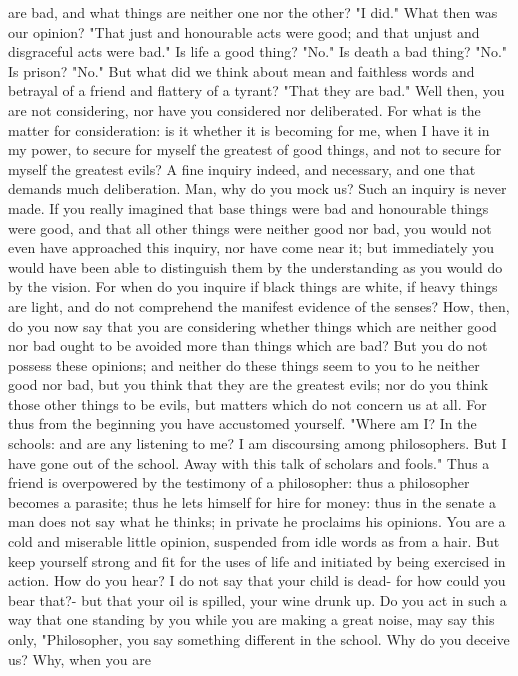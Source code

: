 \documentclass[a4paper]{article}
\begin{document}
are bad, and what things are neither one nor the other? "I did." What then was
our opinion? "That just and honourable acts were good; and that unjust and
disgraceful acts were bad." Is life a good thing? "No." Is death a bad thing?
"No." Is prison? "No." But what did we think about mean and faithless words and
betrayal of a friend and flattery of a tyrant? "That they are bad." Well then,
you are not considering, nor have you considered nor deliberated. For what is
the matter for consideration: is it whether it is becoming for me, when I have
it in my power, to secure for myself the greatest of good things, and not to
secure for myself the greatest evils? A fine inquiry indeed, and necessary, and
one that demands much deliberation. Man, why do you mock us? Such an inquiry is
never made. If you really imagined that base things were bad and honourable
things were good, and that all other things were neither good nor bad, you
would not even have approached this inquiry, nor have come near it; but
immediately you would have been able to distinguish them by the understanding
as you would do by the vision. For when do you inquire if black things are
white, if heavy things are light, and do not comprehend the manifest evidence
of the senses? How, then, do you now say that you are considering whether
things which are neither good nor bad ought to be avoided more than things
which are bad? But you do not possess these opinions; and neither do these
things seem to you to he neither good nor bad, but you think that they are the
greatest evils; nor do you think those other things to be evils, but matters
which do not concern us at all. For thus from the beginning you have accustomed
yourself. "Where am I? In the schools: and are any listening to me? I am
discoursing among philosophers. But I have gone out of the school. Away with
this talk of scholars and fools." Thus a friend is overpowered by the testimony
of a philosopher: thus a philosopher becomes a parasite; thus he lets himself
for hire for money: thus in the senate a man does not say what he thinks; in
private he proclaims his opinions. You are a cold and miserable little opinion,
suspended from idle words as from a hair. But keep yourself strong and fit for
the uses of life and initiated by being exercised in action. How do you hear? I
do not say that your child is dead- for how could you bear that?- but that your
oil is spilled, your wine drunk up. Do you act in such a way that one standing
by you while you are making a great noise, may say this only, "Philosopher, you
say something different in the school. Why do you deceive us? Why, when you are
\end{document}
